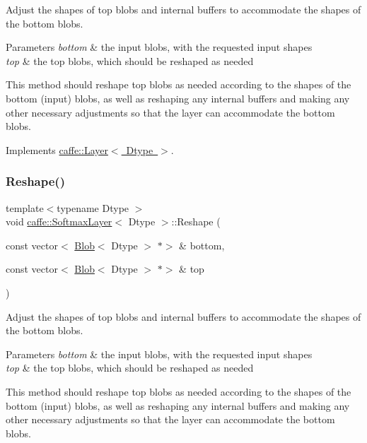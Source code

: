 Adjust the shapes of top blobs and internal buffers to accommodate the shapes of the bottom blobs. 


\begin{DoxyParams}{Parameters}
{\em bottom} & the input blobs, with the requested input shapes \\
\hline
{\em top} & the top blobs, which should be reshaped as needed\\
\hline
\end{DoxyParams}
This method should reshape top blobs as needed according to the shapes of the bottom (input) blobs, as well as reshaping any internal buffers and making any other necessary adjustments so that the layer can accommodate the bottom blobs. 

Implements \mbox{\hyperlink{classcaffe_1_1_layer_a7fe981e8af8d93d587acf2a952be563d}{caffe\+::\+Layer$<$ Dtype $>$}}.

\mbox{\label{classcaffe_1_1_softmax_layer_a756fd5ad3af07d019b5f2247f38b4496}} 
\subsubsection{\texorpdfstring{Reshape()}{Reshape()}\hspace{0.1cm}{\footnotesize\ttfamily [2/2]}}
{\footnotesize\ttfamily template$<$typename Dtype $>$ \\
void \mbox{\hyperlink{classcaffe_1_1_softmax_layer}{caffe\+::\+Softmax\+Layer}}$<$ Dtype $>$\+::Reshape (\begin{DoxyParamCaption}\item[{const vector$<$ \mbox{\hyperlink{classcaffe_1_1_blob}{Blob}}$<$ Dtype $>$ $\ast$$>$ \&}]{bottom,  }\item[{const vector$<$ \mbox{\hyperlink{classcaffe_1_1_blob}{Blob}}$<$ Dtype $>$ $\ast$$>$ \&}]{top }\end{DoxyParamCaption})\hspace{0.3cm}{\ttfamily [virtual]}}



Adjust the shapes of top blobs and internal buffers to accommodate the shapes of the bottom blobs. 


\begin{DoxyParams}{Parameters}
{\em bottom} & the input blobs, with the requested input shapes \\
\hline
{\em top} & the top blobs, which should be reshaped as needed\\
\hline
\end{DoxyParams}
This method should reshape top blobs as needed according to the shapes of the bottom (input) blobs, as well as reshaping any internal buffers and making any other necessary adjustments so that the layer can accommodate the bottom blobs. 

